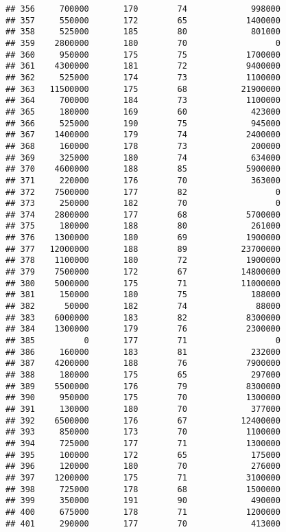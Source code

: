 \documentclass[
]{article}
\begin{document}
\begin{verbatim}
## 356     700000       170        74             998000
## 357     550000       172        65            1400000
## 358     525000       185        80             801000
## 359    2800000       180        70                  0
## 360     950000       175        75            1700000
## 361    4300000       181        72            9400000
## 362     525000       174        73            1100000
## 363   11500000       175        68           21900000
## 364     700000       184        73            1100000
## 365     180000       169        60             423000
## 366     525000       190        75             945000
## 367    1400000       179        74            2400000
## 368     160000       178        73             200000
## 369     325000       180        74             634000
## 370    4600000       188        85            5900000
## 371     220000       176        70             363000
## 372    7500000       177        82                  0
## 373     250000       182        70                  0
## 374    2800000       177        68            5700000
## 375     180000       188        80             261000
## 376    1300000       180        69            1900000
## 377   12000000       188        89           23700000
## 378    1100000       180        72            1900000
## 379    7500000       172        67           14800000
## 380    5000000       175        71           11000000
## 381     150000       180        75             188000
## 382      50000       182        74              88000
## 383    6000000       183        82            8300000
## 384    1300000       179        76            2300000
## 385          0       177        71                  0
## 386     160000       183        81             232000
## 387    4200000       188        76            7900000
## 388     180000       175        65             297000
## 389    5500000       176        79            8300000
## 390     950000       175        70            1300000
## 391     130000       180        70             377000
## 392    6500000       176        67           12400000
## 393     850000       173        70            1100000
## 394     725000       177        71            1300000
## 395     100000       172        65             175000
## 396     120000       180        70             276000
## 397    1200000       175        71            3100000
## 398     725000       178        68            1500000
## 399     350000       191        90             490000
## 400     675000       178        71            1200000
## 401     290000       177        70             413000

\end{verbatim}
\end{document}

